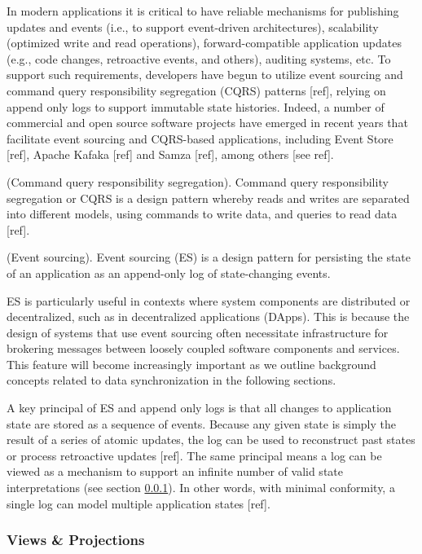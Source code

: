 \documentclass{comjnl}
\begin{document}
In modern applications it is critical to have reliable mechanisms for publishing updates and events (i.e., to support event-driven architectures), scalability (optimized write and read operations), forward-compatible application updates (e.g., code changes, retroactive events, and others), auditing systems, etc. To support such requirements, developers have begun to utilize event sourcing and command query responsibility segregation (CQRS) patterns [ref], relying on append only logs to support immutable state histories. Indeed, a number of commercial and open source software projects have emerged in recent years that facilitate event sourcing and CQRS-based applications, including Event Store [ref], Apache Kafaka [ref] and Samza [ref], among others [see ref]. 

\begin{definition} (Command query responsibility segregation). Command query responsibility segregation or CQRS is a design pattern whereby reads and writes are separated into different models, using commands to write data, and queries to read data [ref]. \end{definition}

\begin{definition} (Event sourcing). Event sourcing (ES) is a design pattern for persisting the state of an application as an append-only log of state-changing events. \end{definition}

ES is particularly useful in contexts where system components are distributed or decentralized, such as in decentralized applications (DApps). This is because the design of systems that use event sourcing often necessitate infrastructure for brokering messages between loosely coupled software components and services. This feature will become increasingly important as we outline background concepts related to data synchronization in the following sections. 

A key principal of ES and append only logs is that all changes to application state are stored as a sequence of events. Because any given state is simply the result of a series of atomic updates, the log can be used to reconstruct past states or process retroactive updates [ref]. The same principal means a log can be viewed as a mechanism to support an infinite number of valid state interpretations (see section  \ref{sec:ViewsProjections}). In other words, with minimal conformity, a single log can model multiple application states [ref].

\subsubsection{Views \& Projections} \label{sec:ViewsProjections}
\end{document}
